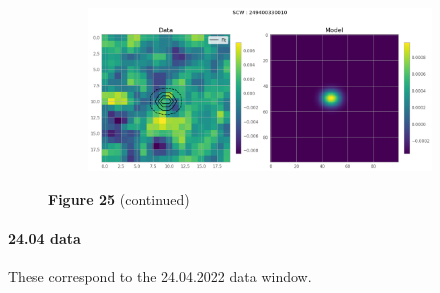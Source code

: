 \documentclass[
	a4paper, %
	10pt, %
	unnumberedsections, %
	twoside, %
]{LTJournalArticle}
\begin{document}
\begin{figure}[H]
\begin{subfigure}{.47\textwidth}
    \end{subfigure}%
    \hspace{1em}
    \begin{subfigure}{.47\textwidth}
        \centering
        \includegraphics[width=\textwidth]{report/Figures/models/2204/33_psf_const.png}
    \end{subfigure}
    \caption*{\textbf{Figure 25} (continued)}
    \end{figure}
\paragraph{24.04 data}
These correspond to the 24.04.2022 data window.
\end{document}
